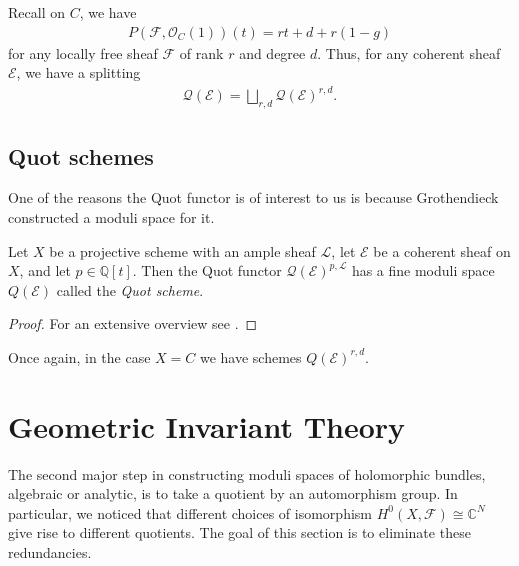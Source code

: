 \documentclass[12pt]{ociamthesis}  %
\begin{document}
\begin{example}
  Recall on $C$, we have
  \begin{align*}
    P(\mathscr F,\mathscr O_C(1))(t) = rt + d + r(1-g)
  \end{align*}
  for any locally free sheaf $\mathscr F$ of rank $r$ and degree $d$.
  Thus, for any coherent sheaf $\mathscr E$, we have a splitting
  \begin{align*}
    \mathcal Q(\mathscr E) = \bigsqcup_{r,d} \mathcal Q(\mathscr E)^{r,d}.
  \end{align*}
  \missingexample
\end{example}

\subsection{Quot schemes}

One of the reasons the Quot functor is of interest to us is because
Grothendieck constructed a moduli space for it. \missingcitation

\begin{theorem}
  Let $X$ be a projective scheme with an ample sheaf $\mathscr L$,
  let $\mathscr E$ be a coherent sheaf on $X$, and let
  $p\in\mathbb{Q}[t]$. Then the Quot functor
  $\mathcal Q(\mathscr E)^{p,\mathscr L}$ has a fine moduli space
  $Q(\mathscr E)$ called the \emph{Quot scheme}.
  \begin{proof}
    For an extensive overview see \cite{hoskins2016}.
  \end{proof}
\end{theorem}

\begin{example}
  Once again, in the case $X=C$ we have schemes
  $Q(\mathscr E)^{r,d}$.
  \missingexample
\end{example}

\missingsection

\section{Geometric Invariant Theory}

The second major step in constructing moduli spaces of holomorphic
bundles, algebraic or analytic, is to take a quotient by an automorphism
group. In particular, we noticed that different choices of isomorphism
$H^0(X,\mathscr F)\cong\mathbb{C}^N$ give rise to different quotients.
The goal of this section is to eliminate these redundancies.
\end{document}
